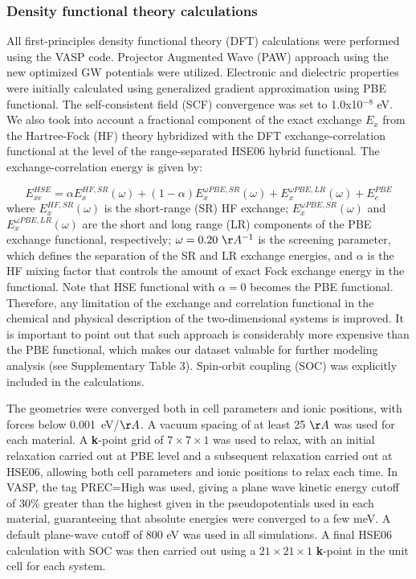 \documentclass[journal=ancac3,manuscript=article,email=true,hyperref=true,keywords=true]{achemso}
\begin{document}
\subsubsection{Density functional theory calculations}
All first-principles density functional theory (DFT) calculations 
were performed using the VASP code\cite{Kresse_1993,Kresse_1996_1,Kresse_1996_2}. 
Projector Augmented Wave (PAW) approach\cite{Kresse_1999_pseudopotentials,PAW-1} 
using the new optimized GW potentials were utilized. Electronic and dielectric properties 
were initially calculated using generalized gradient approximation 
using PBE functional\cite{PBE}. The self-consistent field (SCF) convergence was set to 1.0x10$^{-8}$ eV. We also took into account a fractional component of the exact
exchange $E_x$ from the Hartree-Fock (HF) theory hybridized with the DFT 
exchange-correlation functional at the level of the range-separated HSE06 hybrid
functional\cite{HSE03,HSE06}. The exchange-correlation energy is given by: 

\begin{equation}
E_{xc}^{HSE}=\alpha E_{x}^{HF, SR} (\omega) + (1-\alpha) E_{x}^{\omega PBE, SR}(\omega) + E_{x}^{\omega PBE, LR} (\omega) + E_c^{PBE}
\end{equation}
where $E_{x}^{HF, SR}(\omega)$ is the short-range (SR) HF exchange; $E_{x}^{\omega PBE, SR}(\omega)$ and $E_{x}^{\omega PBE, LR}(\omega)$ are the short and long range (LR) components of the PBE 
exchange functional, respectively; $\omega= 0.20~\AA^{-1}$ is the screening parameter, 
which defines the separation of the SR and LR exchange energies, and $\alpha$ is the 
HF mixing factor that controls the amount of exact Fock exchange energy 
in the functional.\cite{HSE03,HSE06} Note that HSE functional with $\alpha =0$ becomes the
PBE functional.\cite{PBE} Therefore, any limitation of the exchange and correlation functional in the chemical and physical description of the two-dimensional systems 
is improved. It is important to point out that 
such approach is considerably more expensive than 
the PBE functional, which makes our dataset valuable for 
further modeling analysis (see Supplementary Table 3). 
Spin-orbit coupling (SOC) was explicitly included in the calculations. 

The geometries were converged both in cell
parameters and ionic positions, with forces below 0.001~eV/$\AA$. 
A vacuum spacing of at least 25 $\AA$ was used for each material. 
A {\bf k}-point grid of \(7\times7\times1\) was used to relax, with an initial relaxation
carried out at PBE level and a subsequent relaxation carried out at
HSE06, allowing both cell parameters and ionic positions to
relax each time. In VASP, the tag {\sc PREC=High} was used, giving a plane
wave kinetic energy cutoff of 30\% greater than the highest given in
the pseudopotentials used in each material, guaranteeing that absolute
energies were converged to a few meV. A default plane-wave cutoff of 800 eV 
was used in all simulations. A final HSE06 calculation with SOC was then carried out
using a \(21\times21\times1\) {\bf k}-point in the unit cell for each system. 
\end{document}
